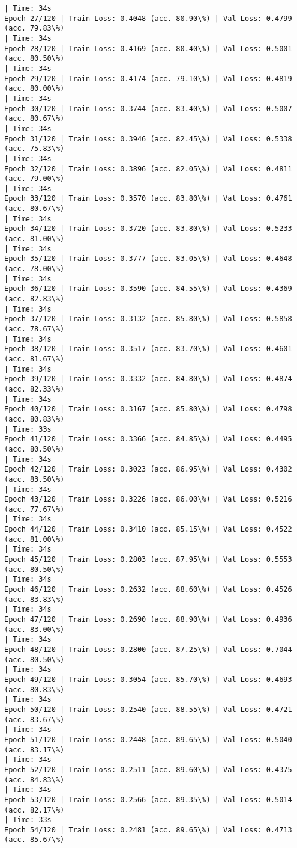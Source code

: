 \documentclass[8pt]{extarticle}
\begin{document}
\begin{Verbatim}[commandchars=\\\{\}]
| Time: 34s
Epoch 27/120 | Train Loss: 0.4048 (acc. 80.90\%) | Val Loss: 0.4799 (acc. 79.83\%)
| Time: 34s
Epoch 28/120 | Train Loss: 0.4169 (acc. 80.40\%) | Val Loss: 0.5001 (acc. 80.50\%)
| Time: 34s
Epoch 29/120 | Train Loss: 0.4174 (acc. 79.10\%) | Val Loss: 0.4819 (acc. 80.00\%)
| Time: 34s
Epoch 30/120 | Train Loss: 0.3744 (acc. 83.40\%) | Val Loss: 0.5007 (acc. 80.67\%)
| Time: 34s
Epoch 31/120 | Train Loss: 0.3946 (acc. 82.45\%) | Val Loss: 0.5338 (acc. 75.83\%)
| Time: 34s
Epoch 32/120 | Train Loss: 0.3896 (acc. 82.05\%) | Val Loss: 0.4811 (acc. 79.00\%)
| Time: 34s
Epoch 33/120 | Train Loss: 0.3570 (acc. 83.80\%) | Val Loss: 0.4761 (acc. 80.67\%)
| Time: 34s
Epoch 34/120 | Train Loss: 0.3720 (acc. 83.80\%) | Val Loss: 0.5233 (acc. 81.00\%)
| Time: 34s
Epoch 35/120 | Train Loss: 0.3777 (acc. 83.05\%) | Val Loss: 0.4648 (acc. 78.00\%)
| Time: 34s
Epoch 36/120 | Train Loss: 0.3590 (acc. 84.55\%) | Val Loss: 0.4369 (acc. 82.83\%)
| Time: 34s
Epoch 37/120 | Train Loss: 0.3132 (acc. 85.80\%) | Val Loss: 0.5858 (acc. 78.67\%)
| Time: 34s
Epoch 38/120 | Train Loss: 0.3517 (acc. 83.70\%) | Val Loss: 0.4601 (acc. 81.67\%)
| Time: 34s
Epoch 39/120 | Train Loss: 0.3332 (acc. 84.80\%) | Val Loss: 0.4874 (acc. 82.33\%)
| Time: 34s
Epoch 40/120 | Train Loss: 0.3167 (acc. 85.80\%) | Val Loss: 0.4798 (acc. 80.83\%)
| Time: 33s
Epoch 41/120 | Train Loss: 0.3366 (acc. 84.85\%) | Val Loss: 0.4495 (acc. 80.50\%)
| Time: 34s
Epoch 42/120 | Train Loss: 0.3023 (acc. 86.95\%) | Val Loss: 0.4302 (acc. 83.50\%)
| Time: 34s
Epoch 43/120 | Train Loss: 0.3226 (acc. 86.00\%) | Val Loss: 0.5216 (acc. 77.67\%)
| Time: 34s
Epoch 44/120 | Train Loss: 0.3410 (acc. 85.15\%) | Val Loss: 0.4522 (acc. 81.00\%)
| Time: 34s
Epoch 45/120 | Train Loss: 0.2803 (acc. 87.95\%) | Val Loss: 0.5553 (acc. 80.50\%)
| Time: 34s
Epoch 46/120 | Train Loss: 0.2632 (acc. 88.60\%) | Val Loss: 0.4526 (acc. 83.83\%)
| Time: 34s
Epoch 47/120 | Train Loss: 0.2690 (acc. 88.90\%) | Val Loss: 0.4936 (acc. 83.00\%)
| Time: 34s
Epoch 48/120 | Train Loss: 0.2800 (acc. 87.25\%) | Val Loss: 0.7044 (acc. 80.50\%)
| Time: 34s
Epoch 49/120 | Train Loss: 0.3054 (acc. 85.70\%) | Val Loss: 0.4693 (acc. 80.83\%)
| Time: 34s
Epoch 50/120 | Train Loss: 0.2540 (acc. 88.55\%) | Val Loss: 0.4721 (acc. 83.67\%)
| Time: 34s
Epoch 51/120 | Train Loss: 0.2448 (acc. 89.65\%) | Val Loss: 0.5040 (acc. 83.17\%)
| Time: 34s
Epoch 52/120 | Train Loss: 0.2511 (acc. 89.60\%) | Val Loss: 0.4375 (acc. 84.83\%)
| Time: 34s
Epoch 53/120 | Train Loss: 0.2566 (acc. 89.35\%) | Val Loss: 0.5014 (acc. 82.17\%)
| Time: 33s
Epoch 54/120 | Train Loss: 0.2481 (acc. 89.65\%) | Val Loss: 0.4713 (acc. 85.67\%)

\end{Verbatim}
\end{document}
